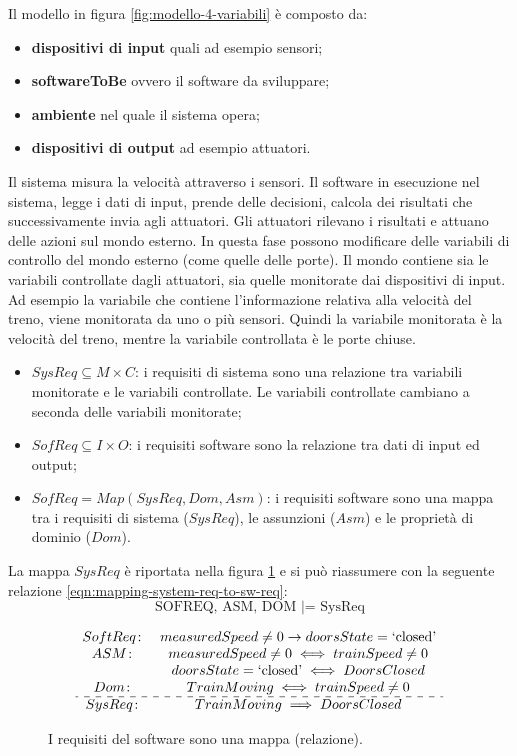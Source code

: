 \documentclass[italian]{article}
\begin{document}
	Il modello in figura \ref{fig:modello-4-variabili} è composto da:
	\begin{itemize}
		\item \textbf{dispositivi di input} quali ad esempio sensori;
		\item \textbf{softwareToBe} ovvero il software da sviluppare;
		\item \textbf{ambiente} nel quale il sistema opera;
		\item \textbf{dispositivi di output} ad esempio attuatori.
	\end{itemize}
	Il sistema misura la velocità attraverso i sensori. Il software in esecuzione nel sistema, legge i dati di input, prende delle decisioni, calcola dei risultati che successivamente invia agli attuatori. Gli attuatori rilevano i risultati e attuano delle azioni sul mondo esterno. In questa fase possono modificare delle variabili di controllo del mondo esterno (come quelle delle porte). Il mondo contiene sia le variabili controllate dagli attuatori, sia quelle monitorate dai dispositivi di input. Ad esempio la variabile che contiene l'informazione relativa alla velocità del treno, viene monitorata da uno o più sensori. Quindi la variabile monitorata è la velocità del treno, mentre la variabile controllata è le porte chiuse.
	\begin{itemize}
		\item 	$SysReq \subseteq M \times C$: i requisiti di sistema sono una relazione tra variabili monitorate e le variabili controllate. Le variabili controllate cambiano a seconda delle variabili monitorate;
		\item $SofReq \subseteq I \times O$: i requisiti software sono la relazione tra dati di input ed output;
		\item $SofReq = Map(SysReq, Dom, Asm)$: i requisiti software sono una mappa tra i requisiti di sistema ($SysReq$), le assunzioni ($Asm$) e le proprietà di dominio ($Dom$).
	\end{itemize}
	La mappa $SysReq$ è riportata nella figura \ref{fig:mappa-sysreq} e si può riassumere con la seguente relazione \ref{eqn:mapping-system-req-to-sw-req}:
	\begin{equation}
		\text{SOFREQ, ASM, DOM |= SysReq}
		\label{eqn:mapping-system-req-to-sw-req}
	\end{equation}
	\begin{figure}[ht]
		\centering
		\begin{eqnarray*}
			\begin{array}{cc}
				SoftReq \colon & measuredSpeed \ne 0 \to doorsState = \text{`closed'}\\
				ASM \colon &  measuredSpeed \ne 0 \iff trainSpeed \ne 0 \\
				&doorsState = \text{`closed'} \iff DoorsClosed\\
				Dom\colon &  TrainMoving \iff trainSpeed \ne 0\\
				\hdashline
				SysReq\colon&  TrainMoving \implies DoorsClosed
			\end{array}
		\end{eqnarray*}
		\caption{I requisiti del software sono una mappa (relazione).}
		\label{fig:mappa-sysreq}
	\end{figure}
\end{document}

